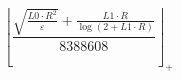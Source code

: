 \[\left\lfloor \frac{\sqrt{\frac{L0 \cdot R^{2}}{\varepsilon}} + \frac{L1 \cdot R}{\log\left(2 + L1 \cdot R\right)}}{8388608} \right\rfloor_{+}\]
